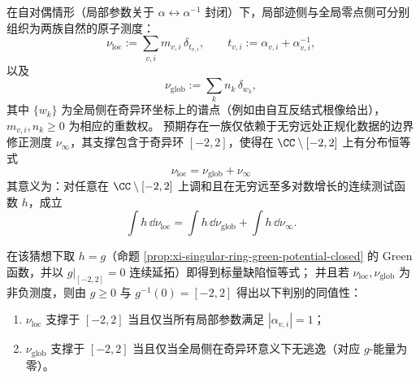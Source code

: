 \begin{conjecture}\label{conj:xi-singular-ring-defect-measure-upgrade}
在自对偶情形（局部参数关于 \(\alpha\leftrightarrow\alpha^{-1}\) 封闭）下，局部迹侧与全局零点侧可分别组织为两族自然的原子测度：
\[
\nu_{\mathrm{loc}}:=\sum_{v,i}m_{v,i}\,\delta_{t_{v,i}},
\qquad
t_{v,i}:=\alpha_{v,i}+\alpha_{v,i}^{-1},
\]
以及
\[
\nu_{\mathrm{glob}}:=\sum_{k}n_k\,\delta_{w_k},
\]
其中 \(\{w_k\}\) 为全局侧在奇异环坐标上的谱点（例如由自互反结式根像给出），\(m_{v,i},n_k\ge 0\) 为相应的重数权。
预期存在一族仅依赖于无穷远处正规化数据的边界修正测度 \(\nu_\infty\)，其支撑包含于奇异环 \([-2,2]\)，使得在 \(\CC\setminus[-2,2]\) 上有分布恒等式
\[
\boxed{\;
\nu_{\mathrm{loc}}=\nu_{\mathrm{glob}}+\nu_\infty\;}
\]
其意义为：对任意在 \(\CC\setminus[-2,2]\) 上调和且在无穷远至多对数增长的连续测试函数 \(h\)，成立
\[
\int h\,\dd\nu_{\mathrm{loc}}=\int h\,\dd\nu_{\mathrm{glob}}+\int h\,\dd\nu_\infty.
\]
\par
在该猜想下取 \(h=g\)（命题 \ref{prop:xi-singular-ring-green-potential-closed} 的 Green 函数，并以 \(g|_{[-2,2]}=0\) 连续延拓）即得到标量缺陷恒等式；
并且若 \(\nu_{\mathrm{loc}},\nu_{\mathrm{glob}}\) 为非负测度，则由 \(g\ge 0\) 与 \(g^{-1}(0)=[-2,2]\) 得出以下判别的同值性：
\begin{enumerate}
  \item \(\nu_{\mathrm{loc}}\) 支撑于 \([-2,2]\) 当且仅当所有局部参数满足 \(|\alpha_{v,i}|=1\)；
  \item \(\nu_{\mathrm{glob}}\) 支撑于 \([-2,2]\) 当且仅当全局侧在奇异环意义下无逃逸（对应 \(g\)-能量为零）。
\end{enumerate}
\end{conjecture}

\endinput

